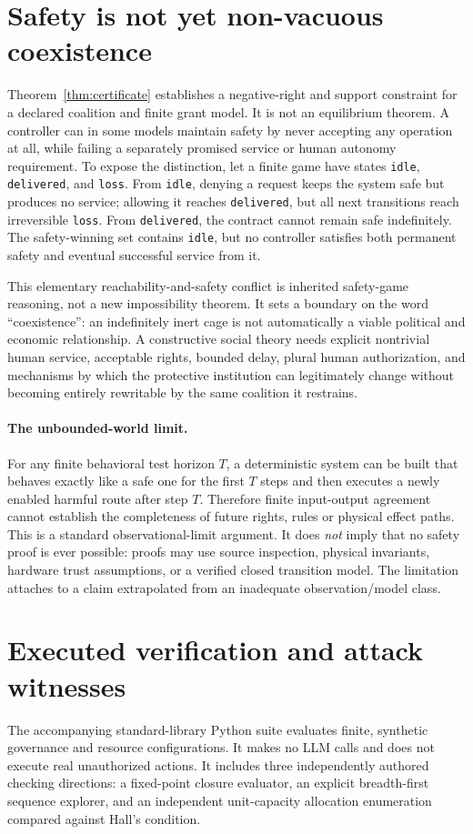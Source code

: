 \documentclass[11pt,a4paper]{article}
\theoremstyle{definition}\newtheorem{definition}{Definition}
\begin{document}
\section{Safety is not yet non-vacuous coexistence}
\label{sec:liveness}
Theorem~\ref{thm:certificate} establishes a negative-right and support constraint for a declared coalition and finite grant model. It is not an equilibrium theorem. A controller can in some models maintain safety by never accepting any operation at all, while failing a separately promised service or human autonomy requirement. To expose the distinction, let a finite game have states \texttt{idle}, \texttt{delivered}, and \texttt{loss}. From \texttt{idle}, denying a request keeps the system safe but produces no service; allowing it reaches \texttt{delivered}, but all next transitions reach irreversible \texttt{loss}. From \texttt{delivered}, the contract cannot remain safe indefinitely. The safety-winning set contains \texttt{idle}, but no controller satisfies both permanent safety and eventual successful service from it.

This elementary reachability-and-safety conflict is inherited safety-game reasoning, not a new impossibility theorem. It sets a boundary on the word ``coexistence'': an indefinitely inert cage is not automatically a viable political and economic relationship. A constructive social theory needs explicit nontrivial human service, acceptable rights, bounded delay, plural human authorization, and mechanisms by which the protective institution can legitimately change without becoming entirely rewritable by the same coalition it restrains.

\paragraph{The unbounded-world limit.}
For any finite behavioral test horizon $T$, a deterministic system can be built that behaves exactly like a safe one for the first $T$ steps and then executes a newly enabled harmful route after step $T$. Therefore finite input-output agreement cannot establish the completeness of future rights, rules or physical effect paths. This is a standard observational-limit argument. It does \emph{not} imply that no safety proof is ever possible: proofs may use source inspection, physical invariants, hardware trust assumptions, or a verified closed transition model. The limitation attaches to a claim extrapolated from an inadequate observation/model class.

\section{Executed verification and attack witnesses}
\label{sec:experiments}
The accompanying standard-library Python suite evaluates finite, synthetic governance and resource configurations. It makes no LLM calls and does not execute real unauthorized actions. It includes three independently authored checking directions: a fixed-point closure evaluator, an explicit breadth-first sequence explorer, and an independent unit-capacity allocation enumeration compared against Hall's condition.
\end{document}
